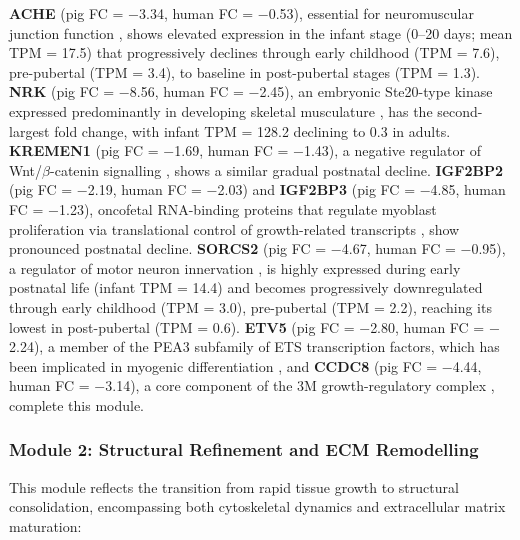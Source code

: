 \textbf{ACHE} (pig FC = $-$3.34, human FC = $-$0.53), essential for neuromuscular junction function \parencite{rotundo_expression_2003}, shows elevated expression in the infant stage (0--20 days; mean TPM = 17.5) that progressively declines through early childhood (TPM = 7.6), pre-pubertal (TPM = 3.4), to baseline in post-pubertal stages (TPM = 1.3). \textbf{NRK} (pig FC = $-$8.56, human FC = $-$2.45), an embryonic Ste20-type kinase expressed predominantly in developing skeletal musculature \parencite{kanai-azuma_nrk_1999}, has the second-largest fold change, with infant TPM = 128.2 declining to 0.3 in adults. \textbf{KREMEN1} (pig FC = $-$1.69, human FC = $-$1.43), a negative regulator of Wnt/$\beta$-catenin signalling \parencite{osada_wnt_2006, qin_canonical_2024}, shows a similar gradual postnatal decline. \textbf{IGF2BP2} (pig FC = $-$2.19, human FC = $-$2.03) and \textbf{IGF2BP3} (pig FC = $-$4.85, human FC = $-$1.23), oncofetal RNA-binding proteins that regulate myoblast proliferation via translational control of growth-related transcripts \parencite{li_hmga2-igf2bp2_2012}, show pronounced postnatal decline. \textbf{SORCS2} (pig FC = $-$4.67, human FC = $-$0.95), a regulator of motor neuron innervation \parencite{thomasen_sorcs2_2023}, is highly expressed during early postnatal life (infant TPM = 14.4) and becomes progressively downregulated through early childhood (TPM = 3.0), pre-pubertal (TPM = 2.2), reaching its lowest in post-pubertal (TPM = 0.6). \textbf{ETV5} (pig FC = $-$2.80, human FC = $-$2.24), a member of the PEA3 subfamily of ETS transcription factors, which has been implicated in myogenic differentiation \parencite{taylor_role_1997}, and \textbf{CCDC8} (pig FC = $-$4.44, human FC = $-$3.14), a core component of the 3M growth-regulatory complex \parencite{hanson_exome_2011}, complete this module.

\subsubsection{Module 2: Structural Refinement and ECM Remodelling}

This module reflects the transition from rapid tissue growth to structural consolidation, encompassing both cytoskeletal dynamics and extracellular matrix maturation:

